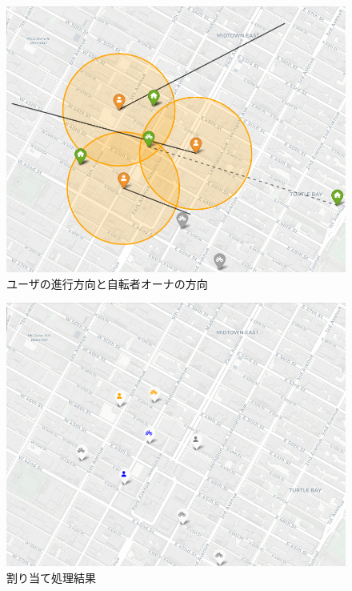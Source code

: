           \begin{figure}[htbp]
            \centering
            \includegraphics[scale=0.35]
            {figures/simulation3.png}
            \caption{ユーザの進行方向と自転者オーナの方向}
            \label{fig:ユーザの進行方向と自転者オーナの方向}
          \end{figure}

          \begin{figure}[htbp]
            \centering
            \includegraphics[scale=0.35]
            {figures/simulation4.png}
            \caption{割り当て処理結果}
            \label{fig:割り当て処理結果}
          \end{figure}

